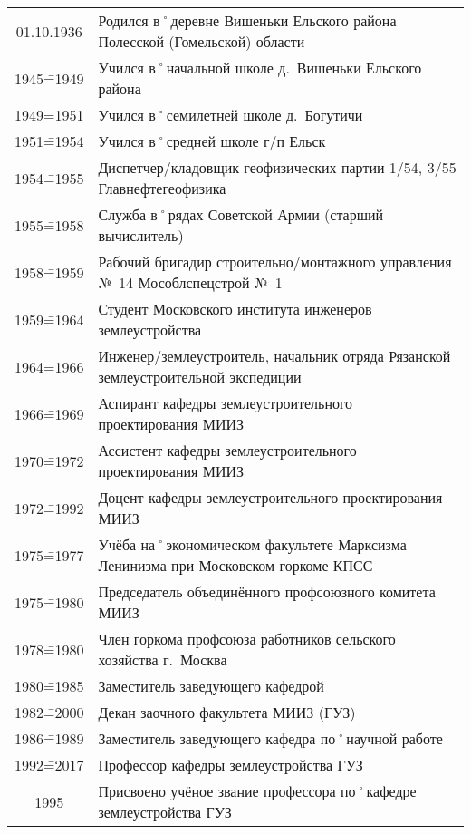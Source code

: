 \begin{table}[t]
{\scriptsize
	\begin{tabularx}{\textwidth}{cX}
		01.10.1936	&	Родился в˚деревне Вишеньки Ельского района Полесской (Гомельской) области			\\
		1945\==1949		&	Учился в˚начальной школе д.~Вишеньки Ельского района								\\
		1949\==1951		&	Учился в˚семилетней школе д.~Богутичи												\\
		1951\==1954		&	Учился в˚средней школе г/п Ельск													\\
		1954\==1955		&	Диспетчер\-/кладовщик геофизических партии 1/54, 3/55 Главнефтегеофизика				\\
		1955\==1958		&	Служба в˚рядах Советской Армии (старший вычислитель)								\\
		1958\==1959		&	Рабочий бригадир строительно\-/монтажного управления №~14 Мособлспецстрой №~1		\\
		1959\==1964		&	Студент Московского института инженеров землеустройства							\\
		1964\==1966		&	Инженер\-/землеустроитель, начальник отряда Рязанской землеустроительной экспедиции	\\
		1966\==1969		&	Аспирант кафедры землеустроительного проектирования МИИЗ							\\
		1970\==1972		&	Ассистент кафедры землеустроительного проектирования МИИЗ							\\
		1972\==1992		&	Доцент кафедры землеустроительного проектирования МИИЗ								\\
		1975\==1977		&	Учёба на˚экономическом факультете Марксизма Ленинизма при Московском горкоме КПСС	\\
		1975\==1980		&	Председатель объединённого профсоюзного комитета МИИЗ								\\
		1978\==1980		&	Член горкома профсоюза работников сельского хозяйства г.~Москва						\\
		1980\==1985		&	Заместитель заведующего кафедрой													\\
		1982\==2000		&	Декан заочного факультета МИИЗ (ГУЗ)												\\
		1986\==1989		&	Заместитель заведующего кафедра по˚научной работе									\\
		1992\==2017		&	Профессор кафедры землеустройства ГУЗ												\\
		1995				&	Присвоено учёное звание профессора по˚кафедре землеустройства ГУЗ					\\

\end{tabularx}}
\end{table}
